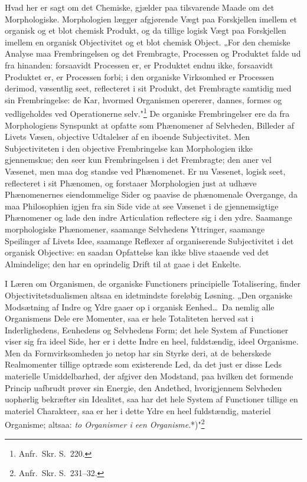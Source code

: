 \documentclass[12pt]{book}
\newcommand{\opage}[1]{\marginnote{\footnotesize\textit{[#1]}}}
\begin{document}
Hvad her er sagt om det Chemiske, gjælder paa tilsvarende Maade om det Morphologiske. Morphologien
lægger afgjørende Vægt paa Forskjellen imellem et organisk og et blot chemisk Produkt, og da tillige
logisk Vægt paa Forskjellen imellem en organisk Objectivitet og et blot chemisk Object. „For den
chemiske Analyse maa Frembringelsen og det Frembragte, Processen og Produktet falde ud fra hinanden:
forsaavidt Processen er, er Produktet endnu ikke, forsaavidt Produktet er, er Processen forbi; i den
organiske Virksomhed er Processen derimod, væsentlig seet, reflecteret i sit Produkt, det Frembragte
samtidig med sin Frembringelse: de Kar, hvormed Organismen opererer, dannes, formes og vedligeholdes
ved Operationerne selv."\footnote{Anfr.\ Skr. S.~220.} De organiske Frembringelser ere da fra
Morphologiens Synspunkt at opfatte som Phænomener af Selvheden, Billeder af Livets Væsen, objective
Udtalelser af en iboende Subjectivitet. Men Subjectiviteten i den objective Frembringelse kan
Morphologien ikke gjennemskue; den seer kun Frembringelsen i det Frembragte; den aner vel Væsenet,
men maa dog standse ved Phænomenet. Er nu Væsenet, logisk seet, reflecteret i sit Phænomen, og
forstaaer Morphologien just at udhæve Phænomenernes eiendommelige Sider og paavise de phænomenale
Overgange, da maa Philosophien igjen fra sin Side vide at see Væsenet i de gjennemsigtige Phænomener
og lade den indre Articulation reflectere sig i den ydre. Saamange morphologiske Phænomener, saamange
Selvhedens Yttringer, saamange Speilinger af Livets
\opage{411} Idee, saamange Reflexer af organiserende Subjectivitet i det organisk Objective: en saadan Opfattelse
kan ikke blive staaende ved det Almindelige; den har en oprindelig Drift til at gaae i det Enkelte.

I Læren om Organismen, de organiske Functioners principielle Totalisering, finder
Objectivitetsdualismen altsaa en idetmindste foreløbig Løsning. „Den organiske Modsætning af Indre og
Ydre gaaer op i organisk Eenhed\ldots\ Da nemlig alle Organismens Dele ere Momenter, saa er hele
Totaliteten herved sat i Inderlighedens, Eenhedens og Selvhedens Form; det hele System af Functioner
viser sig fra ideel Side, her er i dette Indre en heel, fuldstændig, ideel Organisme. Men da
Formvirksomheden jo netop har sin Styrke deri, at de beherskede Realmomenter tillige optræde som
existerende Led, da det just er disse Leds materielle Umiddelbarhed, der afgiver den Modstand, paa
hvilken det formende Princip uafbrudt prøver sin Energie, den Andethed, hvorigjennem Selvheden
uophørlig bekræfter sin Idealitet, saa har det hele System af Functioner tillige en materiel
Charakteer, saa er her i dette Ydre en heel fuldstændig, materiel Organisme; altsaa: \emph{to
Organismer i een Organisme}.*)"\footnote{Anfr.\ Skr. S.~231--32.}
\end{document}
